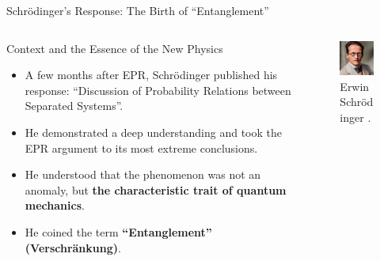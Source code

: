\begin{frame}{Schrödinger's Response: The Birth of ``Entanglement''}

  \begin{columns}[T] %
    \begin{column}{0.6\textwidth}
      \begin{block}{Context and the Essence of the New Physics}
        \begin{itemize}[<+->]
          \item A few months after EPR, Schrödinger published his response: ``Discussion of Probability Relations between Separated Systems''.
          \item He demonstrated a deep understanding and took the EPR argument to its most extreme conclusions.
          \item He understood that the phenomenon was not an anomaly, but \textbf{the characteristic trait of quantum mechanics}.
          \item He coined the term \textbf{``Entanglement'' (Verschränkung)}.
        \end{itemize}
    \end{block}
\end{column}

    \begin{column}{0.4\textwidth}
      \begin{figure}
        \centering
        \includegraphics[width=\linewidth, height=0.7\textheight, keepaspectratio]{images/schrodinger.jpeg}
        \caption{Erwin Schrödinger \cite{fotografo_desconocido_retrato_1933}.}
      \end{figure}
    \end{column}
  \end{columns}

\end{frame}

